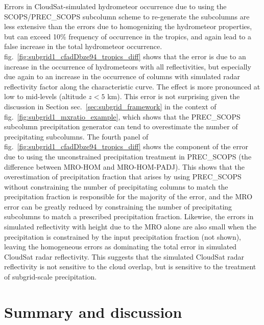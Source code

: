 Errors in CloudSat-simulated hydrometeor occurrence due to using the
SCOPS/PREC\_SCOPS subcolumn scheme to re-generate the subcolumns are
less extensive than the errors due to homogenizing the hydrometeor
properties, but can exceed 10\% frequency of occurrence in the tropics,
and again lead to a false increase in the total hydrometeor occurrence.
fig.~\ref{fig:subgrid1_cfadDbze94_tropics_diff} shows that the error is
due to an increase in the occurrence of hydrometeors with all
reflectivities, but especially due again to an increase in the
occurrence of columns with simulated radar reflectivity factor along the
characteristic curve. The effect is more pronounced at low to mid-levels
(altitude \(z < 5\) km). This error is not surprising given the
discussion in Section sec.~\ref{sec:subgrid_framework} in the context of
fig.~\ref{fig:subgrid1_mxratio_example}, which shows that the
PREC\_SCOPS subcolumn precipitation generator can tend to overestimate
the number of precipitating subcolumns. The fourth panel of
fig.~\ref{fig:subgrid1_cfadDbze94_tropics_diff} shows the component of
the error due to using the unconstrained precipitation treatment in
PREC\_SCOPS (the difference between MRO-HOM and MRO-HOM-PADJ). This
shows that the overestimation of precipitation fraction that arises by
using PREC\_SCOPS without constraining the number of precipitating
columns to match the precipitation fraction is responsible for the
majority of the error, and the MRO error can be greatly reduced by
constraining the number of precipitating subcolumns to match a
prescribed precipitation fraction. Likewise, the errors in simulated
reflectivity with height due to the MRO alone are also small when the
precipitation is constrained by the input precipitation fraction (not
shown), leaving the homogeneous errors as dominating the total error in
simulated CloudSat radar reflectivity. This suggests that the simulated
CloudSat radar reflectivity is not sensitive to the cloud overlap, but
is sensitive to the treatment of subgrid-scale precipitation.

\section{Summary and discussion}\label{sec:summary-and-discussion}

